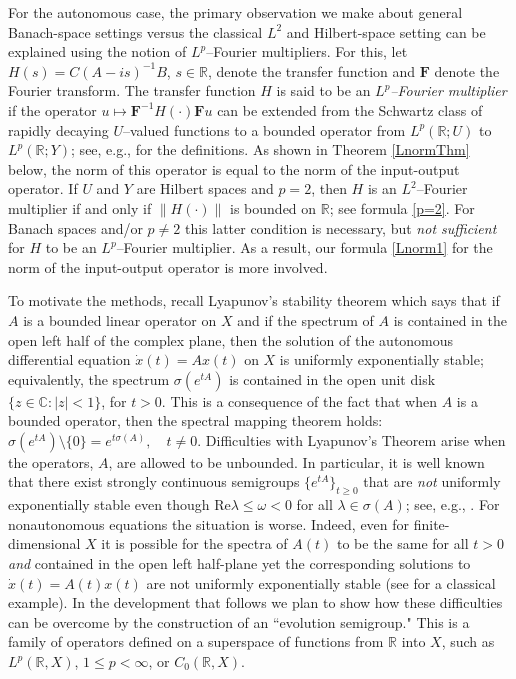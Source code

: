 \documentclass[10pt,psamsfonts,leqno]{siamltex}
\newcommand{\bbC}{\mathbb{C}}
\newcommand{\bbR}{\mathbb{R}}
\newcommand{\CoR}{{C_0(\bbR,X)}}
\newcommand{\LpR}{{L^p(\bbR,X)}}
\begin{document}
For the autonomous case,  the primary observation we make
about general Banach-space settings versus the classical
$L^2$ and Hilbert-space setting
can be explained using the notion of $L^p$--Fourier multipliers.
For this, let $H(s)=C(A-is)^{-1}B$,
$s\in{\mathbb R}$, denote the transfer function and ${\mathbf F}$
denote the Fourier transform. The transfer function $H$ is said to be
an {\em $L^p$--Fourier multiplier} if the operator $u\mapsto {\mathbf
F}^{-1}H(\cdot){\mathbf F}u$ can be extended from the Schwartz class of
rapidly decaying $U$--valued functions to a bounded operator from
$L^p({\mathbb R};U)$ to $L^p({\mathbb R};Y)$;
see, e.g., \cite{Am2} for the definitions.
As shown in Theorem \ref{LnormThm} below,
the norm of this operator is equal to the norm
of the input-output operator.
If $U$ and $Y$ are Hilbert spaces and $p=2$, then $H$ is an $L^2$--Fourier
multiplier if and only if $\|H(\cdot)\|$ is bounded on ${\mathbb R}$;
see formula \eqref{p=2}. For Banach spaces and/or $p\neq 2$ this latter
condition is necessary, but {\em not sufficient} for $H$ to be an
$L^p$--Fourier multiplier.  As a result, our formula \eqref{Lnorm1} for
the norm of the input-output operator is more involved.

To motivate the methods,
 recall Lyapunov's stability theorem which says that if
$A$ is a bounded linear operator on $X$ and if the spectrum of $A$ is
contained in the open left half of the complex plane, then the solution
of the autonomous differential equation
$\dot{x}(t)=Ax(t)$ on $X$  is uniformly exponentially stable;
equivalently,  the spectrum $\sigma(e^{tA})$ is contained in the open
unit disk $\{z\in\bbC:|z|<1\}$, for $t>0$.
This is a consequence of the fact that when $A$ is a bounded operator,
then the spectral mapping theorem holds:
$
\sigma(e^{tA})\setminus\{0\}=e^{t\sigma(A)},\quad t\ne 0.
$
Difficulties with Lyapunov's Theorem arise when the operators, $A$, are
allowed to be unbounded.   In particular, it is well known that there
exist strongly continuous semigroups
$\{e^{tA}\}_{t\ge 0}$  that are {\em not} uniformly exponentially stable
even though $\mbox{Re}\lambda\le \omega<0$ for all
$\lambda\in\sigma(A)$; see, e.g., \cite{Nagel,vanNbook,Renardy}.
  For nonautonomous equations the situation is worse. Indeed,  even for
finite-dimensional $X$ it is possible for the spectra of $A(t)$ to be
the same for all $t>0$ {\em and} contained in the open left half-plane
yet the corresponding solutions to
$\dot{x}(t)=A(t)x(t)$ are not uniformly
exponentially stable (see \cite[Exm.7.1]{Hale} for a classical example).
In the development that follows we plan to show how these difficulties
can be overcome by the construction of an ``evolution semigroup."  This
is a family of operators defined on a  superspace  of functions from
$\bbR$ into $X$, such as
$\LpR$, $1\le p<\infty$, or
$\CoR$.
\end{document}
